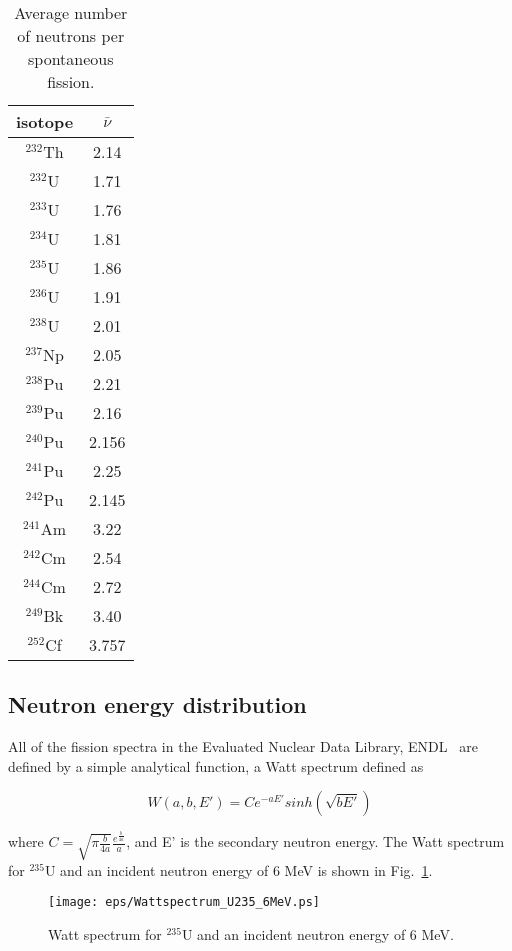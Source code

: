 \documentclass[11pt]{article}
\begin{document}
\begin{table}[ht]
\footnotesize
\begin{center}
\begin{tabular}{|c|c|} \hline
isotope & $\bar{\nu}$ \\ \hline
$^{232}$Th & 2.14 \\
$^{232}$U  & 1.71\\
$^{233}$U  & 1.76\\
$^{234}$U  & 1.81\\
$^{235}$U  & 1.86\\
$^{236}$U  & 1.91\\
$^{238}$U  & 2.01\\
$^{237}$Np & 2.05\\
$^{238}$Pu & 2.21\\
$^{239}$Pu & 2.16\\
$^{240}$Pu & 2.156\\
$^{241}$Pu & 2.25\\
$^{242}$Pu & 2.145\\
$^{241}$Am & 3.22\\
$^{242}$Cm & 2.54\\
$^{244}$Cm & 2.72\\
$^{249}$Bk & 3.40\\
$^{252}$Cf & 3.757\\ \hline
\end{tabular}
\end{center}
\caption{Average number of neutrons per spontaneous fission.}
\label{Nubar for spontaneous fission}
\end{table}

\subsection{Neutron energy distribution}

All of the fission spectra in the Evaluated Nuclear Data Library,
ENDL~\cite{ENDL 1975} are defined by a simple analytical function, a
Watt spectrum defined as

\begin{equation}
W(a,b,E') = Ce^{-aE'}sinh(\sqrt{bE'})
\end{equation}

where $C=\sqrt{\pi\frac{b}{4a}}\frac{e^{\frac{b}{4a}}}{a}$, and E' is the secondary neutron energy.
The Watt spectrum for $^{235}$U and an incident neutron energy of 6 MeV is shown in Fig.~\ref{Watt spectrum for U235}.

\begin{figure}[ht]
\begin{center}
\texttt{[image: eps/Wattspectrum\_U235\_6MeV.ps]}
\end{center}
\caption{Watt spectrum for $^{235}$U and an incident neutron energy of 6 MeV.}
\label{Watt spectrum for U235}
\end{figure}
\end{document}
